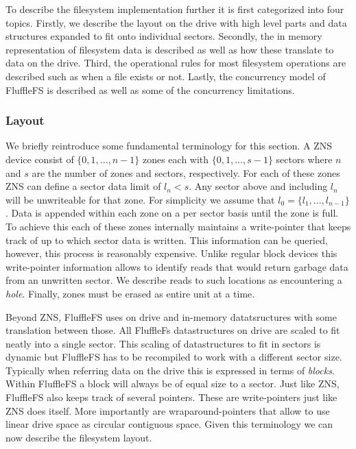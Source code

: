 To describe the filesystem implementation further it is first categorized into
four topics. Firstly, we describe the layout on the drive with high level parts
and data structures expanded to fit onto individual sectors. Secondly, the
in memory representation of filesystem data is described as well as how these
translate to data on the drive. Third, the operational rules for most filesystem
operations are described such as when a file exists or not. Lastly, the
concurrency model of FluffleFS is described as well as some of the concurrency
limitations.

\subsubsection{Layout}

We briefly reintroduce some fundamental terminology for this section. A ZNS
device consist of $\{0,1,...,n-1\}$ zones each with $\{0,1,...,s-1\}$ sectors
where $n$ and $s$ are the number of zones and sectors, respectively. For each of
these zones ZNS can define a sector data limit of $l_{n} < s$. Any sector above
and including $l_{n}$ will be unwriteable for that zone. For simplicity we
assume that $l_{0} = \{l_{1},...,l_{n-1}\}$. Data is appended within each zone
on a per sector basis until the zone is full. To achieve this each of these
zones internally maintains a write-pointer that keeps track of up to which
sector data is written. This information can be queried, however, this process
is reasonably expensive. Unlike regular block devices this write-pointer
information allows to identify reads that would return garbage data from an
unwritten sector. We describe reads to such locations as encountering a
\textit{hole}. Finally, zones must be erased as entire unit at a time.

Beyond ZNS, FluffleFS uses on drive and in-memory datatsructures with some
translation between those. All FluffleFs datastructures on drive are scaled to
fit neatly into a single sector. This scaling of datastructures to fit in
sectors is dynamic but FluffleFS has to be recompiled to work with a different
sector size. Typically when referring data on the drive this is expressed in
terms of \textit{blocks}. Within FluffleFS a block will always be of equal size
to a sector. Just like ZNS, FluffleFS also keeps track of several pointers.
These are write-pointers just like ZNS does itself. More importantly are
wraparound-pointers that allow to use linear drive space as circular contiguous
space. Given this terminology we can now describe the filesystem layout.

